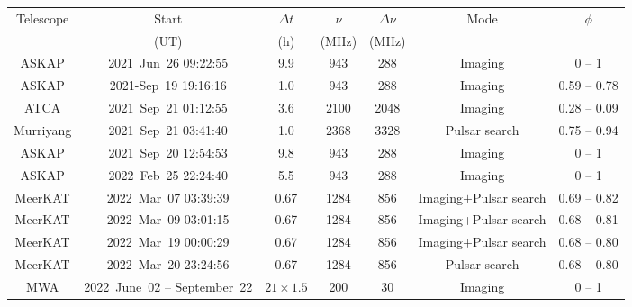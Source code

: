\documentclass[fleqn,usenatbib]{mnras}
\begin{document}
\begin{table*}
    \centering
    \begin{tabular}{ccccccc}
    \hline
    {Telescope }  & {Start} & {$\Delta t$} & {$\nu$} & {$\Delta \nu$} & {Mode} & $\phi$ \\
    {}        & {(UT)}                      & {(h)}      & {(MHz)}             & {(MHz)} & {} & {} \\
    \hline
    \hline
         ASKAP     & 2021~Jun~26 09:22:55 & 9.9 & 943 & 288 & Imaging   &  0 -- 1 \\
         ASKAP     & 2021-Sep~19 19:16:16 & 1.0 & 943 & 288 & Imaging   &  0.59 -- 0.78 \\
         ATCA      & 2021~Sep~21 01:12:55 & 3.6 & 2100 & 2048 & Imaging   & 0.28 -- 0.09 \\
         Murriyang & 2021~Sep~21 03:41:40 & 1.0 & 2368 & 3328 & Pulsar search  &  0.75 -- 0.94 \\
         ASKAP     & 2021~Sep~20 12:54:53 & 9.8 & 943 & 288 & Imaging   &  0 -- 1 \\
         ASKAP     & 2022~Feb~25 22:24:40 & 5.5 & 943 & 288 & Imaging   &  0 -- 1 \\
         MeerKAT   & 2022~Mar~07 03:39:39 & 0.67 & 1284 & 856 & Imaging$+$Pulsar search  & 0.69 -- 0.82 \\
         MeerKAT   & 2022~Mar~09 03:01:15 & 0.67 & 1284 & 856 & Imaging+Pulsar search  & 0.68 -- 0.81 \\
         MeerKAT   & 2022~Mar~19 00:00:29 & 0.67 & 1284 & 856 & Imaging$+$Pulsar search  & 0.68 -- 0.80 \\
         MeerKAT   & 2022~Mar~20 23:24:56 & 0.67 & 1284 & 856 & Pulsar search  & 0.68 -- 0.80 \\
         MWA & 2022~June~02 -- September~22 & $21\times1.5$ & 200 & 30 & Imaging  &  0 -- 1 \\

\end{tabular}
\end{table*}
\end{document}
